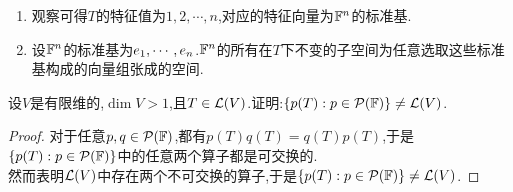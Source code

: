 \documentclass{ctexart}
\begin{document}
\begin{solution}[Solution.]
    \begin{enumerate}[label=\tbf{(\arabic*)}]
        \item 观察可得$T$的特征值为$1,2,\cdots,n$,对应的特征向量为$\mathbb{F}^n$的标准基.
        \item 设$\mathbb{F}^n$的标准基为${e}_1,\cdots,{e}_{n}$.$\mathbb{F}^n$的所有在$T$下不变的子空间为任意选取这些标准基构成的向量组张成的空间.
    \end{enumerate}
\end{solution}
\begin{problem}[43.]
    设$V$是有限维的,$\dim V>1$,且$T\in\mathcal{L}(V)$.证明:$\left\{p(T):p\in\mathcal{P}(\mathbb{F})\right\}\neq\mathcal{L}(V)$.
\end{problem}
\begin{proof}
    对于任意$p,q\in\mathcal{P}(\mathbb{F})$,都有$p(T)q(T)=q(T)p(T)$,于是$\left\{p(T):p\in\mathcal{P}(\mathbb{F})\right\}$中的任意两个算子都是可交换的.\\
    然而表明$\mathcal{L}(V)$中存在两个不可交换的算子,于是$\left\{p(T):p\in\mathcal{P}(\mathbb{F})\right\}\neq\mathcal{L}(V)$.
\end{proof}
\end{document}
